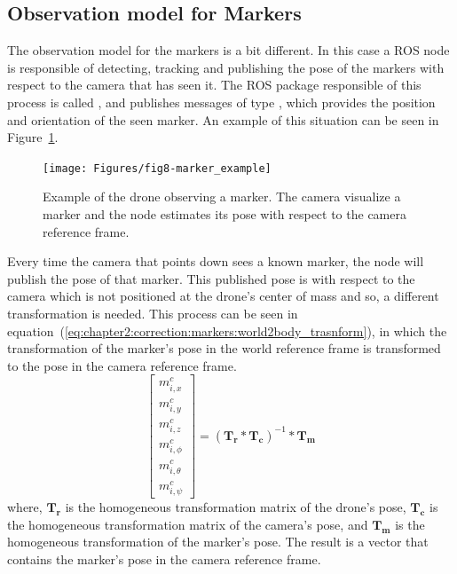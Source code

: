 \subsection{Observation model for Markers}
\label{subsec:chapter2:correction:markers}

The observation model for the markers is a bit different. In this case a ROS node is responsible of detecting, tracking and publishing the pose of the markers with respect to the camera that has seen it. The ROS package responsible of this process is called , and publishes messages of type , which provides the position and orientation of the seen marker. An example of this situation can be seen in Figure~\ref{fig:chapter2:correction:markers:example}.\\

\begin{figure}[h]
    \centering
    \texttt{[image: Figures/fig8-marker\_example]}
    \caption[Example of the drone observing a marker]{Example of the drone observing a marker. The camera visualize a marker and the node  estimates its pose with respect to the camera reference frame.}
    \label{fig:chapter2:correction:markers:example}
\end{figure}

Every time the camera that points down sees a known marker, the  node will publish the pose of that marker. This published pose is with respect to the camera which is not positioned at the drone's center of mass and so, a different transformation is needed. This process can be seen in equation~(\ref{eq:chapter2:correction:markers:world2body_trasnform}), in which the transformation of the marker's pose in the world reference frame is transformed to the pose in the camera reference frame.
\begin{equation}
    \begin{bmatrix}
        m_{i, x}^c \\ m_{i, y}^c \\ m_{i, z}^c \\ m_{i, \phi}^c \\ m_{i, \theta}^c \\ m_{i, \psi}^c
    \end{bmatrix} = (\bm{T_r} * \bm{T_c})^{-1} * \bm{T_m}
    \label{eq:chapter2:correction:markers:world2body_trasnform}
\end{equation}
where, $\bm{T_r}$ is the homogeneous transformation matrix of the drone's pose, $\bm{T_c}$ is the homogeneous transformation matrix of the camera's pose, and $\bm{T_m}$ is the homogeneous transformation of the marker's pose. The result is a vector that contains the marker's pose in the camera reference frame.\\

